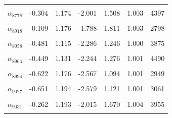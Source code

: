 \begin{longtable}{lrrrrrr}
\cellcolor{gray!10}{$\alpha_{8764}$} & \cellcolor{gray!10}{-0.196} & \cellcolor{gray!10}{1.157} & \cellcolor{gray!10}{-1.900} & \cellcolor{gray!10}{1.646} & \cellcolor{gray!10}{1.003} & \cellcolor{gray!10}{3316}\\
$\alpha_{8778}$ & -0.304 & 1.174 & -2.001 & 1.508 & 1.003 & 4397\\
\cellcolor{gray!10}{$\alpha_{8913}$} & \cellcolor{gray!10}{-0.448} & \cellcolor{gray!10}{1.155} & \cellcolor{gray!10}{-2.258} & \cellcolor{gray!10}{1.289} & \cellcolor{gray!10}{1.003} & \cellcolor{gray!10}{4102}\\
$\alpha_{8918}$ & -0.109 & 1.176 & -1.788 & 1.811 & 1.003 & 2798\\
\cellcolor{gray!10}{$\alpha_{8922}$} & \cellcolor{gray!10}{-0.549} & \cellcolor{gray!10}{1.174} & \cellcolor{gray!10}{-2.411} & \cellcolor{gray!10}{1.165} & \cellcolor{gray!10}{1.001} & \cellcolor{gray!10}{3709}\\
$\alpha_{8958}$ & -0.481 & 1.115 & -2.286 & 1.246 & 1.000 & 3875\\
\cellcolor{gray!10}{$\alpha_{8959}$} & \cellcolor{gray!10}{-0.157} & \cellcolor{gray!10}{1.135} & \cellcolor{gray!10}{-1.823} & \cellcolor{gray!10}{1.691} & \cellcolor{gray!10}{1.003} & \cellcolor{gray!10}{3047}\\
$\alpha_{8964}$ & -0.449 & 1.131 & -2.244 & 1.276 & 1.001 & 4490\\
\cellcolor{gray!10}{$\alpha_{8968}$} & \cellcolor{gray!10}{-0.385} & \cellcolor{gray!10}{1.216} & \cellcolor{gray!10}{-2.233} & \cellcolor{gray!10}{1.493} & \cellcolor{gray!10}{1.003} & \cellcolor{gray!10}{4554}\\
$\alpha_{8994}$ & -0.622 & 1.176 & -2.567 & 1.094 & 1.001 & 2949\\
\cellcolor{gray!10}{$\alpha_{9017}$} & \cellcolor{gray!10}{-0.385} & \cellcolor{gray!10}{1.169} & \cellcolor{gray!10}{-2.160} & \cellcolor{gray!10}{1.403} & \cellcolor{gray!10}{1.001} & \cellcolor{gray!10}{4682}\\
$\alpha_{9027}$ & -0.651 & 1.194 & -2.579 & 1.121 & 1.001 & 3061\\
\cellcolor{gray!10}{$\alpha_{9030}$} & \cellcolor{gray!10}{-0.597} & \cellcolor{gray!10}{1.150} & \cellcolor{gray!10}{-2.480} & \cellcolor{gray!10}{1.132} & \cellcolor{gray!10}{1.001} & \cellcolor{gray!10}{3372}\\
$\alpha_{9031}$ & -0.262 & 1.193 & -2.015 & 1.670 & 1.004 & 3955\\
\cellcolor{gray!10}{$\alpha_{9052}$} & \cellcolor{gray!10}{-0.214} & \cellcolor{gray!10}{1.171} & \cellcolor{gray!10}{-1.934} & \cellcolor{gray!10}{1.671} & \cellcolor{gray!10}{1.001} & \cellcolor{gray!10}{3688}\\

\end{longtable}
